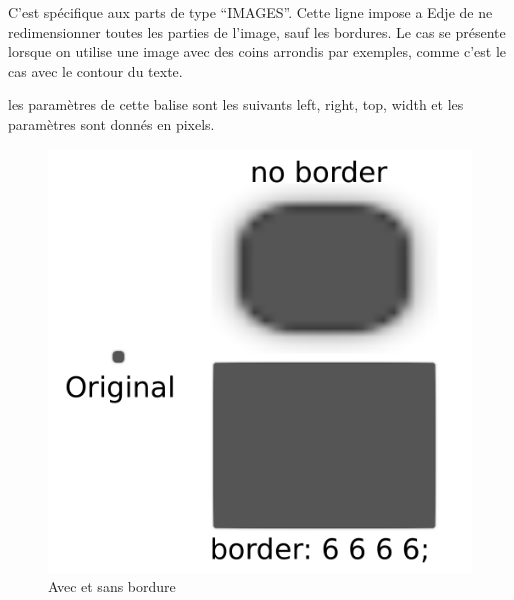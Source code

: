 \documentclass[a4paper]{efr}
\begin{document}
C'est spécifique aux parts de type ``IMAGES''. Cette ligne impose a Edje de ne
redimensionner toutes les parties de l'image, sauf les bordures. Le cas se
présente lorsque on utilise une image avec des coins arrondis par
exemples, comme c'est le cas avec le contour du texte.

les paramètres de cette balise sont les suivants left, right, top, width et les
paramètres sont donnés en pixels.

\begin{figure}
  \begin{center}
    \includegraphics[scale=0.5]{images/border_diff.pdf}
  \end{center}
  \caption{Avec et sans bordure}
\end{figure}
\end{document}
